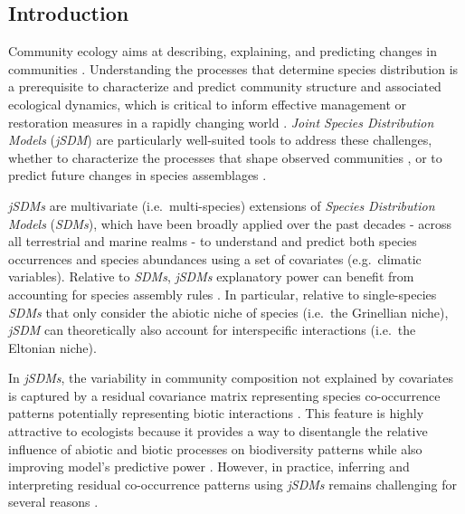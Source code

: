 \begin{refsection}
\clearpage

\hypertarget{introduction-chapter1}{%
\section{Introduction}\label{introduction-chapter1}}

Community ecology aims at describing, explaining, and predicting changes
in communities \autocite{Tredennick_2021}. Understanding the processes
that determine species distribution is a prerequisite to characterize
and predict community structure and associated ecological dynamics,
which is critical to inform effective management or restoration measures
in a rapidly changing world \autocites[ ]{Dietze_2018}{Brudvig_2022}.
\emph{Joint Species Distribution Models} (\emph{jSDM}) are particularly
well-suited tools to address these challenges, whether to characterize
the processes that shape observed communities \autocites[
]{Warton_2015}{Ovaskainen_2017b}, or to predict future changes in
species assemblages \autocites[ ]{Norberg_2019}{Pollock_2020}.

\emph{jSDMs} are multivariate (i.e.~multi-species) extensions of
\emph{Species Distribution Models} (\emph{SDMs}), which have been
broadly applied over the past decades - across all terrestrial and
marine realms - to understand and predict both species occurrences
\autocites[ ]{Elith_2006}{Norberg_2019} and species abundances
\autocites[ ]{Howard_2014}{Waldock_2022} using a set of covariates
(e.g.~climatic variables). Relative to \emph{SDMs}, \emph{jSDMs}
explanatory power can benefit from accounting for species assembly rules
\autocite{Ovaskainen_2017a}. In particular, relative to single-species
\emph{SDMs} that only consider the abiotic niche of species (i.e.~the
Grinellian niche), \emph{jSDM} can theoretically also account for
interspecific interactions (i.e.~the Eltonian niche).

In \emph{jSDMs}, the variability in community composition not explained
by covariates is captured by a residual covariance matrix representing
species co-occurrence patterns potentially representing biotic
interactions \autocite{Ovaskainen_2017a}. This feature is highly
attractive to ecologists because it provides a way to disentangle the
relative influence of abiotic and biotic processes on biodiversity
patterns \autocite{Godsoe_2017} while also improving model's predictive
power \autocites[ ]{Giannini_2013}{Staniczenko_2017}. However, in
practice, inferring and interpreting residual co-occurrence patterns
using \emph{jSDMs} remains challenging for several reasons \autocites[
]{Blanchet_2020}{Holt_2020}.


\end{refsection}
